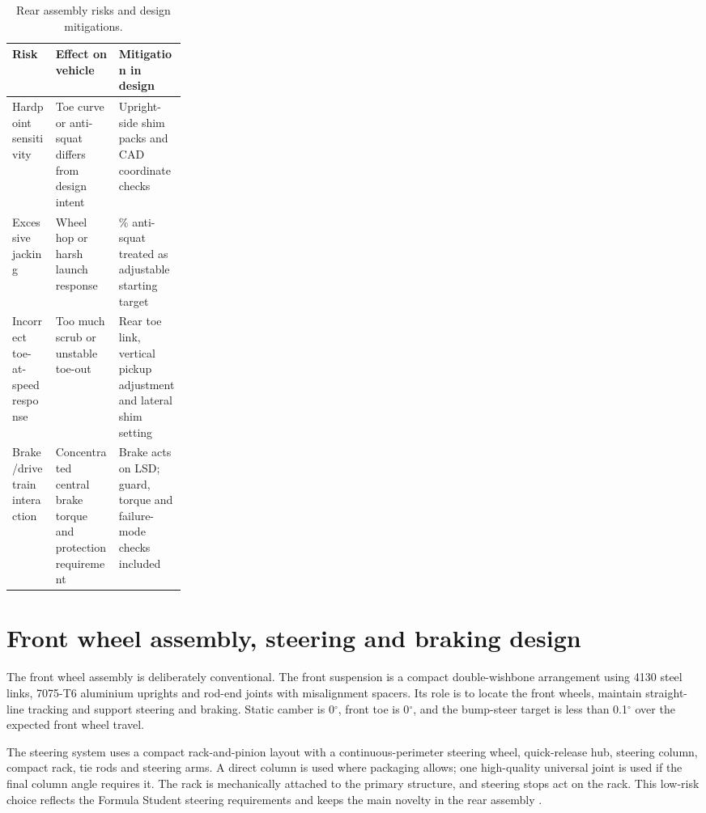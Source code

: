 \begin{table}[H]
\centering
\caption{Rear assembly risks and design mitigations.}
\label{tab:rear_risks_wheel}
\setlength{\tabcolsep}{4pt}
\begin{tabularx}{\linewidth}{|>{\raggedright\arraybackslash}p{0.25\linewidth}|>{\raggedright\arraybackslash}X|>{\raggedright\arraybackslash}X|}
\hline
\textbf{Risk} & \textbf{Effect on vehicle} & \textbf{Mitigation in design} \\
\hline
Hardpoint sensitivity & Toe curve or anti-squat differs from design intent & Upright-side shim packs and CAD coordinate checks \\
\hline
Excessive jacking & Wheel hop or harsh launch response & 100\% anti-squat treated as adjustable starting target \\
\hline
Incorrect toe-at-speed response & Too much scrub or unstable toe-out & Rear toe link, vertical pickup adjustment and lateral shim setting \\
\hline
Brake/drivetrain interaction & Concentrated central brake torque and protection requirement & Brake acts on LSD; guard, torque and failure-mode checks included \\
\hline
\end{tabularx}
\end{table}

\section{Front wheel assembly, steering and braking design}

The front wheel assembly is deliberately conventional. The front suspension is a compact double-wishbone arrangement using 4130 steel links, 7075-T6 aluminium uprights and rod-end joints with misalignment spacers. Its role is to locate the front wheels, maintain straight-line tracking and support steering and braking. Static camber is 0\(^{\circ}\), front toe is 0\(^{\circ}\), and the bump-steer target is less than 0.1\(^{\circ}\) over the expected front wheel travel.

The steering system uses a compact rack-and-pinion layout with a continuous-perimeter steering wheel, quick-release hub, steering column, compact rack, tie rods and steering arms. A direct column is used where packaging allows; one high-quality universal joint is used if the final column angle requires it. The rack is mechanically attached to the primary structure, and steering stops act on the rack. This low-risk choice reflects the Formula Student steering requirements and keeps the main novelty in the rear assembly \parencite{zxFSUK2026Rules,zxFSG2026Rules}.

